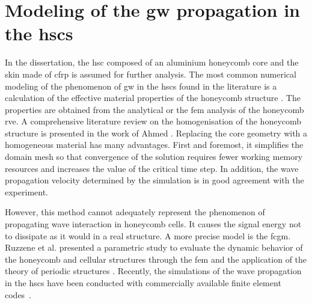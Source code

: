 \section{Modeling of the \acs{gw} propagation in the \acsp{hsc}}
\label{sec:modelling}



In the dissertation, the \ac{hsc} composed of an aluminium honeycomb core and the skin made of \ac{cfrp} is assumed for further analysis.
The most common numerical modeling of the phenomenon of \ac{gw} in the \acp{hsc} found in the literature is a calculation of the effective material properties of the honeycomb structure \cite{baid2015dispersion, mustapha2014leaky, qi2008ultrasonic,  shi1995derivation, sikdar2016guided}.
The properties are obtained from the analytical \cite{gibson1982mechanics, malek2015effective} or the \ac{fem} \cite{catapano2014multi, chen2014analysis} analysis of the honeycomb \ac{rve}.
A comprehensive literature review on the homogenisation of the honeycomb structure is presented in the work of Ahmed \cite{ahmed2019homogenization}.
Replacing the core geometry with a homogeneous material has many advantages.
First and foremost, it simplifies the domain mesh so that convergence of the solution requires fewer working memory resources and increases the value of the critical time step.
In addition, the wave propagation velocity determined by the simulation is in good agreement with the experiment.

However, this method cannot adequately represent the phenomenon of propagating wave interaction in honeycomb cells.
It causes the signal energy not to dissipate as it would in a real structure.
A more precise model is the \ac{fcgm}. 
Ruzzene et al. presented a parametric study to evaluate the dynamic behavior of the honeycomb and cellular structures through the \ac{fem} and the application of the theory of periodic structures \cite{ruzzene2003wave}.
Recently, the simulations of the wave propagation in the \acp{hsc} have been conducted with commercially available finite element codes~\cite{song2009guided, hosseini2013numerical, tian2015wavenumber, zhao2018wave}.

